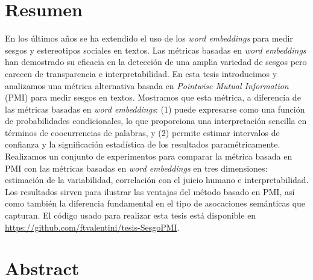 
\chapter*{Resumen}

En los últimos años se ha extendido el uso de los \emph{word embeddings} para medir sesgos y estereotipos sociales en textos. Las métricas basadas en \emph{word embeddings} han demostrado su eficacia en la detección de una amplia variedad de sesgos pero carecen de transparencia e interpretabilidad. En esta tesis introducimos y analizamos una métrica alternativa basada en \emph{Pointwise Mutual Information} (PMI) para medir sesgos en textos. Mostramos que esta métrica, a diferencia de las métricas basadas en \emph{word embeddings}: (1) puede expresarse como una función de probabilidades condicionales, lo que proporciona una interpretación sencilla en términos de coocurrencias de palabras, y (2) permite estimar intervalos de confianza y la significación estadística de los resultados paramétricamente. Realizamos un conjunto de experimentos para comparar la métrica basada en PMI con las métricas basadas en \emph{word embeddings} en tres dimensiones: estimación de la variabilidad, correlación con el juicio humano e interpretabilidad. Los resultados sirven para ilustrar las ventajas del método basado en PMI, así como también la diferencia fundamental en el tipo de asocaciones semánticas que capturan. El código usado para realizar esta tesis está disponible en \url{https://github.com/ftvalentini/tesis-SesgoPMI}.


\vspace{1cm}

{\let\clearpage\relax\chapter*{Abstract}}

